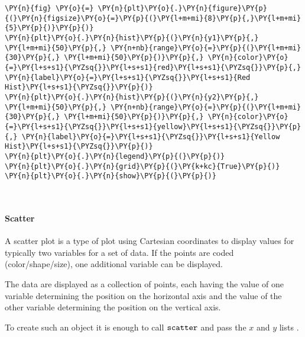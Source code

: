 \begin{tcolorbox}[breakable, size=fbox, boxrule=1pt, pad at break*=1mm,colback=cellbackground, colframe=cellborder]
\begin{Verbatim}[commandchars=\\\{\}]
\PY{n}{fig} \PY{o}{=} \PY{n}{plt}\PY{o}{.}\PY{n}{figure}\PY{p}{(}\PY{n}{figsize}\PY{o}{=}\PY{p}{(}\PY{l+m+mi}{8}\PY{p}{,}\PY{l+m+mi}{5}\PY{p}{)}\PY{p}{)}
\PY{n}{plt}\PY{o}{.}\PY{n}{hist}\PY{p}{(}\PY{n}{y1}\PY{p}{,} \PY{l+m+mi}{50}\PY{p}{,} \PY{n+nb}{range}\PY{o}{=}\PY{p}{(}\PY{l+m+mi}{30}\PY{p}{,} \PY{l+m+mi}{50}\PY{p}{)}\PY{p}{,} \PY{n}{color}\PY{o}{=}\PY{l+s+s1}{\PYZsq{}}\PY{l+s+s1}{red}\PY{l+s+s1}{\PYZsq{}}\PY{p}{,} \PY{n}{label}\PY{o}{=}\PY{l+s+s1}{\PYZsq{}}\PY{l+s+s1}{Red Hist}\PY{l+s+s1}{\PYZsq{}}\PY{p}{)}
\PY{n}{plt}\PY{o}{.}\PY{n}{hist}\PY{p}{(}\PY{n}{y2}\PY{p}{,} \PY{l+m+mi}{50}\PY{p}{,} \PY{n+nb}{range}\PY{o}{=}\PY{p}{(}\PY{l+m+mi}{30}\PY{p}{,} \PY{l+m+mi}{50}\PY{p}{)}\PY{p}{,} \PY{n}{color}\PY{o}{=}\PY{l+s+s1}{\PYZsq{}}\PY{l+s+s1}{yellow}\PY{l+s+s1}{\PYZsq{}}\PY{p}{,} \PY{n}{label}\PY{o}{=}\PY{l+s+s1}{\PYZsq{}}\PY{l+s+s1}{Yellow Hist}\PY{l+s+s1}{\PYZsq{}}\PY{p}{)}
\PY{n}{plt}\PY{o}{.}\PY{n}{legend}\PY{p}{(}\PY{p}{)}
\PY{n}{plt}\PY{o}{.}\PY{n}{grid}\PY{p}{(}\PY{k+kc}{True}\PY{p}{)}
\PY{n}{plt}\PY{o}{.}\PY{n}{show}\PY{p}{(}\PY{p}{)}
\end{Verbatim}
\end{tcolorbox}

    \begin{center}
    \end{center}
    { \hspace*{\fill} \\}
    
    \hypertarget{scatter}{%
\paragraph{Scatter}\label{scatter}}

A scatter plot is a type of plot using Cartesian coordinates to display
values for typically two variables for a set of data. If the points are
coded (color/shape/size), one additional variable can be displayed.

The data are displayed as a collection of points, each having the value
of one variable determining the position on the horizontal axis and the
value of the other variable determining the position on the vertical
axis.

To create such an object it is enough to call \(\tt{scatter}\) and pass
the \(x\) and \(y\) lists .

